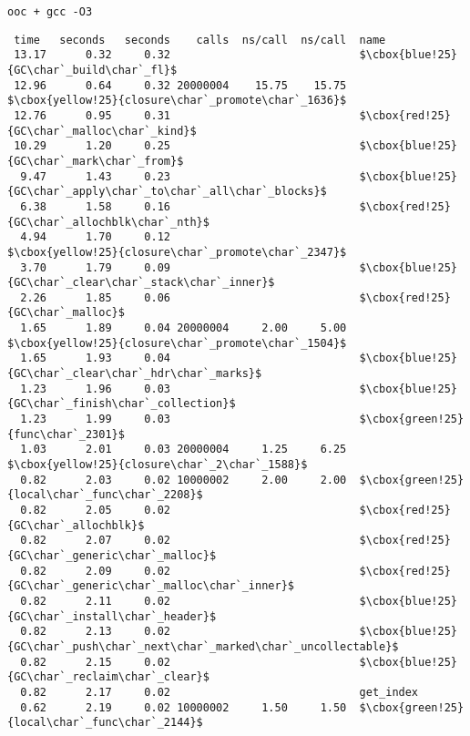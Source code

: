 \texttt{ooc + gcc -O3}
\begin{lstlisting}[basicstyle=\linespread{0.8}\ttfamily\footnotesize,
basewidth={.4em,.2em}, frame=single]
  %   cumulative   self              self     total           
 time   seconds   seconds    calls  ns/call  ns/call  name    
 13.17      0.32     0.32                             $\cbox{blue!25}{GC\char`_build\char`_fl}$
 12.96      0.64     0.32 20000004    15.75    15.75  $\cbox{yellow!25}{closure\char`_promote\char`_1636}$
 12.76      0.95     0.31                             $\cbox{red!25}{GC\char`_malloc\char`_kind}$
 10.29      1.20     0.25                             $\cbox{blue!25}{GC\char`_mark\char`_from}$
  9.47      1.43     0.23                             $\cbox{blue!25}{GC\char`_apply\char`_to\char`_all\char`_blocks}$
  6.38      1.58     0.16                             $\cbox{red!25}{GC\char`_allochblk\char`_nth}$
  4.94      1.70     0.12                             $\cbox{yellow!25}{closure\char`_promote\char`_2347}$
  3.70      1.79     0.09                             $\cbox{blue!25}{GC\char`_clear\char`_stack\char`_inner}$
  2.26      1.85     0.06                             $\cbox{red!25}{GC\char`_malloc}$
  1.65      1.89     0.04 20000004     2.00     5.00  $\cbox{yellow!25}{closure\char`_promote\char`_1504}$
  1.65      1.93     0.04                             $\cbox{blue!25}{GC\char`_clear\char`_hdr\char`_marks}$
  1.23      1.96     0.03                             $\cbox{blue!25}{GC\char`_finish\char`_collection}$
  1.23      1.99     0.03                             $\cbox{green!25}{func\char`_2301}$
  1.03      2.01     0.03 20000004     1.25     6.25  $\cbox{yellow!25}{closure\char`_2\char`_1588}$
  0.82      2.03     0.02 10000002     2.00     2.00  $\cbox{green!25}{local\char`_func\char`_2208}$
  0.82      2.05     0.02                             $\cbox{red!25}{GC\char`_allochblk}$
  0.82      2.07     0.02                             $\cbox{red!25}{GC\char`_generic\char`_malloc}$
  0.82      2.09     0.02                             $\cbox{red!25}{GC\char`_generic\char`_malloc\char`_inner}$
  0.82      2.11     0.02                             $\cbox{blue!25}{GC\char`_install\char`_header}$
  0.82      2.13     0.02                             $\cbox{blue!25}{GC\char`_push\char`_next\char`_marked\char`_uncollectable}$
  0.82      2.15     0.02                             $\cbox{blue!25}{GC\char`_reclaim\char`_clear}$
  0.82      2.17     0.02                             get_index
  0.62      2.19     0.02 10000002     1.50     1.50  $\cbox{green!25}{local\char`_func\char`_2144}$

\end{lstlisting}
